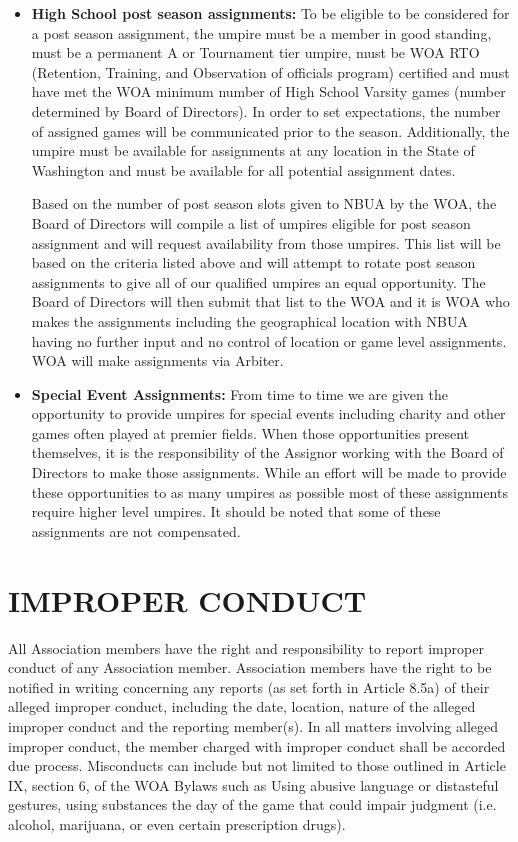 \documentclass[letterpaper,11pt,colorlinks=true,allcolors=blue]{article}
\begin{document}
\begin{itemize}
\item \textbf{High School post season assignments:} To be eligible to be considered for a post season assignment, the umpire must be a member in good standing, must be a permanent A or Tournament tier umpire, must be WOA RTO (Retention, Training, and Observation of officials program) certified and must have met the WOA minimum number of High School Varsity games (number determined by Board of Directors). In order to set expectations, the number of assigned games will be communicated prior to the season.  Additionally, the umpire must be available for assignments at any location in the State of Washington and must be available for all potential assignment dates. 

Based on the number of post season slots given to NBUA by the WOA, the Board of Directors will compile a list of umpires eligible for post season assignment and will request availability from those umpires. This list will be based on the criteria listed above and will attempt to rotate post season assignments to give all of our qualified umpires an equal opportunity. The Board of Directors will then submit that list to the WOA and it is WOA who makes the assignments including the geographical location with NBUA having no further input and no control of location or game level assignments.  WOA will make assignments via Arbiter.

\item \textbf{Special Event Assignments:} From time to time we are given the opportunity to provide umpires for special events including charity and other games often played at premier fields. When those opportunities present themselves, it is the responsibility of the Assignor working with the Board of Directors to make those assignments. While an effort will be made to provide these opportunities to as many umpires as possible most of these assignments require higher level umpires. It should be noted that some of these assignments are not compensated.
\end{itemize}

\newpage
\section{IMPROPER CONDUCT}

All Association members have the right and responsibility to report improper conduct of any Association member.  Association members have the right to be notified in writing concerning any reports (as set forth in Article 8.5a) of their alleged improper conduct, including the date, location, nature of the alleged improper conduct and the reporting member(s).  In all matters involving alleged improper conduct, the member charged with improper conduct shall be accorded due process.  Misconducts can include but not limited to those outlined in Article IX, section 6, of the WOA Bylaws such as Using abusive language or distasteful gestures, using substances the day of the game that could impair judgment (i.e. alcohol, marijuana, or even certain prescription drugs).
\end{document}
